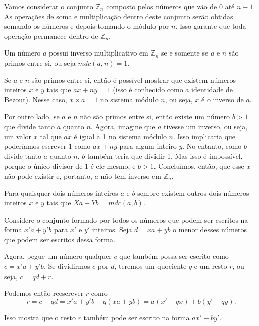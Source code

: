 Vamos considerar o conjunto $\mathbb{Z}_n$ composto pelos números que vão de $0$ até $n-1$.
As operações de soma e multiplicação dentro deste conjunto serão obtidas somando os números e depois tomando o módulo por $n$.
Isso garante que toda operação permanece dentro de $\mathbb{Z}_n$.

\begin{proposition}
\label{prop:inverso}
Um número $a$ possui inverso multiplicativo em $\mathbb{Z}_n$ se e somente se $a$ e $n$ são primos entre si, ou seja $mdc(a,n) = 1$.
\end{proposition}


Se $a$ e $n$ são primos entre si, então é possível mostrar que existem números inteiros $x$ e $y$ tais que $ax + ny = 1$ (isso é conhecido como a identidade de Bezout).
Nesse caso, $x \times a = 1$ no sistema módulo $n$, ou seja, $x$ é o inverso de $a$.

Por outro lado, se $a$ e $n$ não são primos entre si, então existe um número $b > 1$ que divide tanto $a$ quanto $n$.
Agora, imagine que $a$ tivesse um inverso, ou seja, um valor $x$ tal que $ax$ é igual a 1 no sistema módulo $n$.
Isso implicaria que poderíamos escrever 1 como $ax + ny$ para algum inteiro $y$.
No entanto, como $b$ divide tanto $a$ quanto $n$, $b$ também teria que dividir 1.
Mas isso é impossível, porque o único divisor de 1 é ele mesmo, e $b > 1$. Concluímos, então, que esse $x$ não pode existir e, portanto, $a$ não tem inverso em $\mathbb{Z}_n$.

\begin{proposition}
  Para quaisquer dois números inteiros $a$ e $b$ sempre existem outros dois números inteiros $x$ e $y$ tais que $Xa + Yb = mdc(a,b)$.
\end{proposition}

Considere o conjunto formado por todos os números que podem ser escritos na forma $x'a + y'b$ para $x'$ e $y'$ inteiros.
Seja $d = xa + yb$ o menor desses números que podem ser escritos dessa forma.

Agora, pegue um número qualquer $c$ que também possa ser escrito como $c = x'a + y'b$.
Se dividirmos $c$ por $d$, teremos um quociente $q$ e um resto $r$, ou seja, $c = qd + r$.

Podemos então reescrever $r$ como
\begin{displaymath}
r = c - qd = x'a + y'b - q(xa + yb) = a(x' - qx) + b(y' - qy).
\end{displaymath}

Isso mostra que o resto $r$ também pode ser escrito na forma $ax' + by'$.

